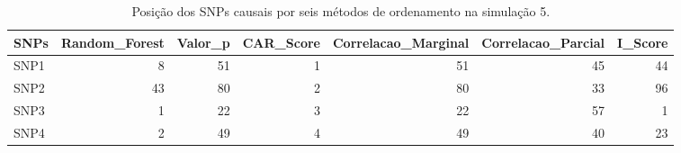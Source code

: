 \begin{table}[ht]
\centering
\begin{tabular}{lrrrrrr}
  \hline
SNPs & Random\_Forest & Valor\_p & CAR\_Score & Correlacao\_Marginal & Correlacao\_Parcial & I\_Score \\ 
  \hline
SNP1 &   8 &  51 &   1 &  51 &  45 &  44 \\ 
  SNP2 &  43 &  80 &   2 &  80 &  33 &  96 \\ 
  SNP3 &   1 &  22 &   3 &  22 &  57 &   1 \\ 
  SNP4 &   2 &  49 &   4 &  49 &  40 &  23 \\ 
   \hline
\end{tabular}
\caption{Posição dos SNPs causais por seis métodos de ordenamento na simulação 5.} 
\label{tab:positions_causais}
\end{table}
